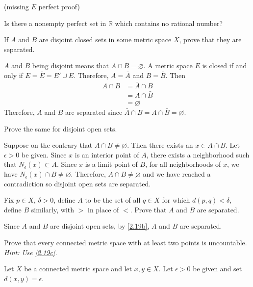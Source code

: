\begin{exercise}
  (missing \(E\) perfect proof)
\item
  Is there a nonempty perfect set in \(\mathbb{R}\) which contains no rational
  number?
\item
  \begin{exercise}[label = (\alph*), ref = \arabic{exercisei} (\alph*)]
  \item
    If \(A\) and \(B\) are disjoint closed sets in some metric space \(X\),
    prove that they are separated.
    \par\smallskip
    \(A\) and \(B\) being disjoint means that \(A\cap B = \varnothing\).
    A metric space \(E\) is closed if and only if \(E = \bar{E} = E'\cup E\).
    Therefore, \(A = \bar{A}\) and \(B = \bar{B}\).
    Then
    \begin{align*}
      A\cap B & = \bar{A}\cap B\\
              & = A\cap\bar{B}\\
              & = \varnothing
    \end{align*}
    Therefore, \(A\) and \(B\) are separated since
    \(\bar{A}\cap B = A\cap\bar{B} = \varnothing\).
  \item
    \label{2.19b}
    Prove the same for disjoint open sets.
    \par\smallskip
    Suppose on the contrary that \(A\cap\bar{B}\neq\varnothing\).
    Then there exists an \(x\in A\cap\bar{B}\).
    Let \(\epsilon > 0\) be given.
    Since \(x\) is an interior point of \(A\), there exists a neighborhood such
    that \(N_{\epsilon}(x)\subset A\).
    Since \(x\) is a limit point of \(B\), for all neighborhoods of \(x\), we
    have \(N_{\epsilon}(x)\cap B\neq\varnothing\).
    Therefore, \(A\cap B\neq\varnothing\) and we have reached a contradiction
    so disjoint open sets are separated.
  \item
    \label{2.19c}
    Fix \(p\in X\), \(\delta > 0\), define \(A\) to be the set of all
    \(q\in X\) for which \(d(p, q) < \delta\), define \(B\) similarly, with
    \(>\) in place of \(<\).
    Prove that \(A\) and \(B\) are separated.
    \par\smallskip
    Since \(A\) and \(B\) are disjoint open sets, by \cref{2.19b}, \(A\) and
    \(B\) are separated.
  \item
    Prove that every connected metric space with at least two points is
    uncountable.
    \textit{Hint: Use \cref{2.19c}.}
    \par\smallskip
    Let \(X\) be a connected metric space and let \(x,y\in X\).
    Let \(\epsilon > 0\) be given and set \(d(x,y) = \epsilon\).

\end{exercise}
\end{exercise}
